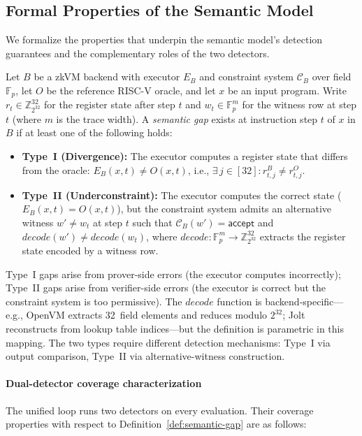 \subsection{Formal Properties of the Semantic Model}\label{sec:formal-properties}

We formalize the properties that underpin the semantic model's detection guarantees and the complementary roles of the two detectors.

\begin{definition}\label{def:semantic-gap}
Let $B$ be a zkVM backend with executor $E_B$ and constraint system $\mathcal{C}_B$ over field $\mathbb{F}_p$, let $O$ be the reference RISC-V oracle, and let $x$ be an input program. Write $r_t \in \mathbb{Z}_{2^{32}}^{32}$ for the register state after step $t$ and $w_t \in \mathbb{F}_p^m$ for the witness row at step $t$ (where $m$ is the trace width). A \emph{semantic gap} exists at instruction step $t$ of $x$ in $B$ if at least one of the following holds:
\begin{itemize}
    \item \textbf{Type~I (Divergence):} The executor computes a register state that differs from the oracle: $E_B(x, t) \neq O(x, t)$, i.e., $\exists\, j \in [32] : r^B_{t,j} \neq r^O_{t,j}$.
    \item \textbf{Type~II (Underconstraint):} The executor computes the correct state ($E_B(x, t) = O(x, t)$), but the constraint system admits an alternative witness $w' \neq w_t$ at step $t$ such that $\mathcal{C}_B(w') = \mathsf{accept}$ and $\mathit{decode}(w') \neq \mathit{decode}(w_t)$, where $\mathit{decode}: \mathbb{F}_p^m \to \mathbb{Z}_{2^{32}}^{32}$ extracts the register state encoded by a witness row.
\end{itemize}
\end{definition}

\noindent Type~I gaps arise from prover-side errors (the executor computes incorrectly); Type~II gaps arise from verifier-side errors (the executor is correct but the constraint system is too permissive). The $\mathit{decode}$ function is backend-specific---e.g., OpenVM extracts 32~field elements and reduces modulo $2^{32}$; Jolt reconstructs from lookup table indices---but the definition is parametric in this mapping. The two types require different detection mechanisms: Type~I via output comparison, Type~II via alternative-witness construction.

\paragraph{Dual-detector coverage characterization}
The unified loop runs two detectors on every evaluation. Their coverage properties with respect to Definition~\ref{def:semantic-gap} are as follows:

